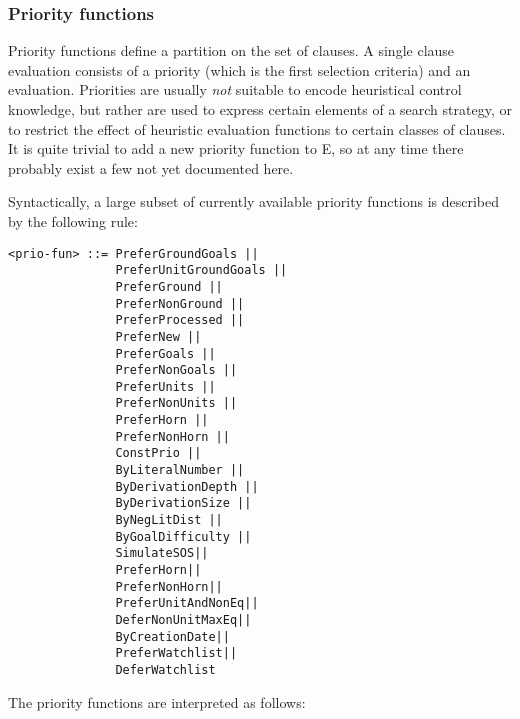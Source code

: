 \documentclass{report}
\begin{document}
\subsubsection{Priority functions}

Priority functions define a partition on the set of clauses.  A single
clause evaluation consists of a priority (which is the first selection
criteria) and an evaluation. Priorities are usually \emph{not} suitable
to encode heuristical control knowledge, but rather are used to
express certain elements of a search strategy, or to restrict the
effect of heuristic evaluation functions to certain classes of
clauses. It is quite trivial to add a new priority function to E, so
at any time there probably exist a few not yet documented here.

Syntactically, a large subset of currently available priority
functions is described by the following rule:

\begin{verbatim}
<prio-fun> ::= PreferGroundGoals ||
               PreferUnitGroundGoals ||
               PreferGround ||
               PreferNonGround ||
               PreferProcessed ||
               PreferNew ||
               PreferGoals ||
               PreferNonGoals ||
               PreferUnits ||
               PreferNonUnits ||
               PreferHorn ||
               PreferNonHorn ||
               ConstPrio ||
               ByLiteralNumber ||
               ByDerivationDepth ||
               ByDerivationSize ||
               ByNegLitDist ||
               ByGoalDifficulty ||
               SimulateSOS||
               PreferHorn||
               PreferNonHorn||
               PreferUnitAndNonEq||
               DeferNonUnitMaxEq||
               ByCreationDate||
               PreferWatchlist||
               DeferWatchlist
\end{verbatim}

The priority functions are interpreted as follows:
\end{document}
